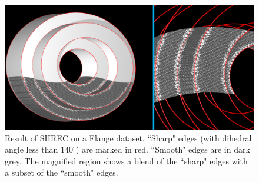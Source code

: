 \begin{figure}[tb]
\includegraphics[width=\linewidth]{images/shrecFlangeCombine2.eps}
\caption{Result of SHREC on a Flange dataset. ``Sharp" edges (with dihedral angle less than $140^\circ$) are marked in red. 
``Smooth" edges are in dark grey. The magnified region shows a blend of the ``sharp" edges with a subset of the ``smooth" edges.}
\label{fig:flange1}
\end{figure}


